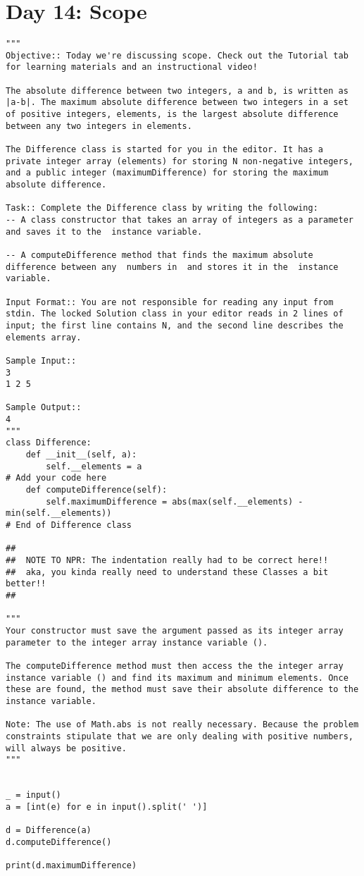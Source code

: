 \documentclass[11pt,a4paper]{article}
\begin{document}
\newpage
\section{Day 14: Scope}
\begin{lstlisting}
"""
Objective:: Today we're discussing scope. Check out the Tutorial tab for learning materials and an instructional video!

The absolute difference between two integers, a and b, is written as |a-b|. The maximum absolute difference between two integers in a set of positive integers, elements, is the largest absolute difference between any two integers in elements.

The Difference class is started for you in the editor. It has a private integer array (elements) for storing N non-negative integers, and a public integer (maximumDifference) for storing the maximum absolute difference.

Task:: Complete the Difference class by writing the following:
-- A class constructor that takes an array of integers as a parameter and saves it to the  instance variable.

-- A computeDifference method that finds the maximum absolute difference between any  numbers in  and stores it in the  instance variable.

Input Format:: You are not responsible for reading any input from stdin. The locked Solution class in your editor reads in 2 lines of input; the first line contains N, and the second line describes the elements array.

Sample Input::
3
1 2 5

Sample Output::
4
"""
class Difference:
    def __init__(self, a):
        self.__elements = a
# Add your code here
    def computeDifference(self):
        self.maximumDifference = abs(max(self.__elements) - min(self.__elements)) 
# End of Difference class

##
##  NOTE TO NPR: The indentation really had to be correct here!!
##  aka, you kinda really need to understand these Classes a bit better!!
##

"""
Your constructor must save the argument passed as its integer array parameter to the integer array instance variable (). 

The computeDifference method must then access the the integer array instance variable () and find its maximum and minimum elements. Once these are found, the method must save their absolute difference to the  instance variable. 

Note: The use of Math.abs is not really necessary. Because the problem constraints stipulate that we are only dealing with positive numbers,  will always be positive. 
"""


_ = input()
a = [int(e) for e in input().split(' ')]

d = Difference(a)
d.computeDifference()

print(d.maximumDifference)
\end{lstlisting}
\end{document}
